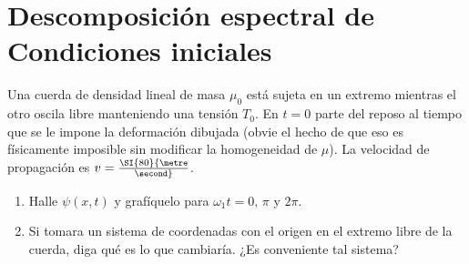 \section*{Descomposición espectral de Condiciones iniciales}

\item
\begin{minipage}[t][2.3cm]{0.6\textwidth}
Una cuerda de densidad lineal de masa $\mu_{0}$ está sujeta en un extremo mientras el otro oscila libre manteniendo una tensión $T_{0}$.
En $t = 0$ parte del reposo al tiempo que se le impone la deformación dibujada (obvie el hecho de que eso es físicamente imposible sin modificar la homogeneidad de $\mu$).
La velocidad de propagación es \(v = \SI{80}{\metre\over\second} \).
\end{minipage}
\begin{minipage}[c][0.4cm][t]{0.34\textwidth}
\end{minipage}
\begin{enumerate}
	\item Halle $\psi(x,t)$ y grafíquelo para $\omega_1 t = 0,\,\pi$ y $2\pi$.
	\item Si tomara un sistema de coordenadas con el origen en el extremo libre de la cuerda, diga qué es lo que cambiaría.
	¿Es conveniente tal sistema?
\end{enumerate}





